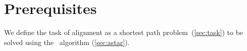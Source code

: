 \section{Prerequisites} \label{sec:prereq}

We define the task of alignment as a shortest path problem~(\cref{sec:task}) to
be solved using the \A~algorithm (\cref{sec:astar}).
%


